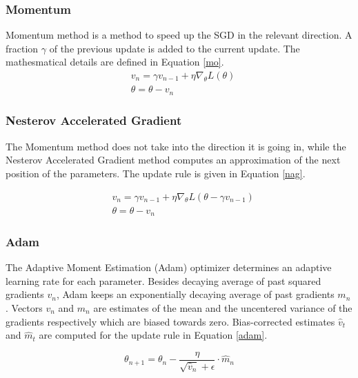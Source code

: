     \subsubsection{Momentum}
    Momentum method is a method to speed up the SGD in the relevant direction.  A fraction $\gamma$ of the previous update is added to the current update. The mathesmatical details are defined in Equation \ref{mo}.
    \begin{equation}
        \begin{aligned}
            & v_n = \gamma v_{n-1} + \eta \nabla_{\theta}L(\theta) \\
            & \theta= \theta - v_{n}
        \end{aligned}
        \label{mo}
    \end{equation} 

    \subsubsection{Nesterov Accelerated Gradient}
    The Momentum method does not take into the direction it is going in, while the Nesterov Accelerated Gradient method computes an approximation of the next position of the parameters. The update rule is given in Equation \ref{nag}.

    \begin{equation}
        \begin{aligned}
            & v_n = \gamma v_{n-1} + \eta \nabla_{\theta}L(\theta - \gamma v_{n-1}) \\
            & \theta= \theta - v_{n}
        \end{aligned}
        \label{nag}
    \end{equation}

    \subsubsection{Adam}
    The Adaptive Moment Estimation (Adam) optimizer \cite{DBLP:journals/corr/KingmaB14} determines an adaptive learning rate for each parameter. Besides decaying average of past squared gradients $v_n$, Adam keeps an exponentially decaying average of past gradients $m_n$. Vectors $v_n$ and $m_n$ are estimates of the mean and the uncentered variance of the gradients respectively which are biased towards zero. Bias-corrected estimates $\hat{v}_t$ and $\hat{m}_t$ are computed for the update rule in Equation \ref{adam}.

    \begin{equation}
        \theta_{n+1} = \theta_{n} - \frac{\eta}{\sqrt{\hat{v}_n} + \epsilon}\cdot \hat{m}_n
    \end{equation}


